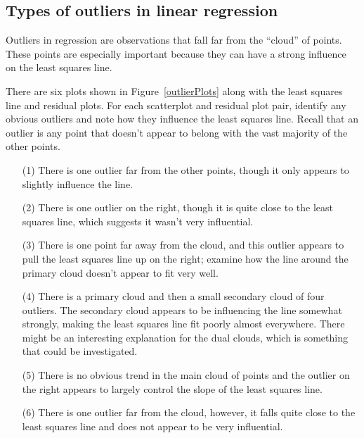 \subsection{Types of outliers in linear regression }
\label{typesOfOutliersInLinearRegression}

Outliers in regression are observations that fall far from the ``cloud'' of points. These points are especially important because they can have a strong influence on the least squares line. 

\begin{examplewrap}
\begin{nexample}{There are six plots shown in Figure~\ref{outlierPlots} along with the least squares line and residual plots. For each scatterplot and residual plot pair, identify any obvious outliers and note how they influence the least squares line. Recall that an outlier is any point that doesn't appear to belong with the vast majority of the other points.}\label{outlierPlotsExample}
\begin{itemize}
\setlength{\itemsep}{0mm}
\item[(1)] There is one outlier far from the other points, though it only appears to slightly influence the line.
\item[(2)] There is one outlier on the right, though it is quite close to the least squares line, which suggests it wasn't very influential.
\item[(3)] There is one point far away from the cloud, and this outlier appears to pull the least squares line up on the right; examine how the line around the primary cloud doesn't appear to fit very well.
\item[(4)] There is a primary cloud and then a small secondary cloud of four outliers. The secondary cloud appears to be influencing the line somewhat strongly, making the least squares line fit poorly almost everywhere. There might be an interesting explanation for the dual clouds, which is something that could be investigated.
\item[(5)] There is no obvious trend in the main cloud of points and the outlier on the right appears to largely control the slope of the least squares line.
\item[(6)] There is one outlier far from the cloud, however, it falls quite close to the least squares line and does not appear to be very influential.
\end{itemize}
\end{nexample}
\end{examplewrap}

